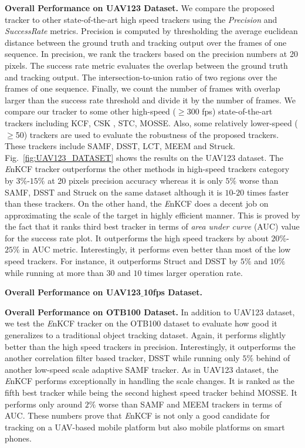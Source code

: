 \documentclass{bmvc2k}
\begin{document}
\textbf{Overall Performance on UAV123 Dataset.}
We compare the proposed tracker to other state-of-the-art high speed
trackers using the \textit{Precision} and \textit{Success\:Rate}
metrics. Precision is computed by thresholding the average euclidean
distance between the ground truth and tracking output over the frames
of one sequence. In precision, we rank the trackers based on the
precision numbers at 20 pixels. The success rate metric evaluates the
overlap between the ground truth and tracking output. The
intersection-to-union ratio of two regions over the frames of one
sequence. Finally, we count the number of frames with overlap larger
than the success rate threshold and divide it by the number of
frames. We compare our tracker to some other high-speed ($\geq$300
fps) state-of-the-art trackers including KCF\cite{henriques2015high},
CSK \cite{henriques2012exploiting}, STC\cite{zhang2014fast},
MOSSE\cite{bolme2010visual,henriques2015high}. Also, some relatively
lower-speed ($\geq$50) trackers are used to evaluate the robustness of
the proposed trackers. These trackers include SAMF\cite{li2014scale},
DSST\cite{danelljan2014accurate}, LCT\cite{ma2015long},
MEEM\cite{zhang2014meem} and Struck\cite{hare2012efficient}.
Fig.~\ref{fig:UAV123_DATASET} shows the results on the UAV123
dataset. The {\it E}nKCF tracker outperforms the other methods in
high-speed trackers category by $3\%$-$15\%$ at 20 pixels precision
accuracy whereas it is only $5\%$ worse than SAMF, DSST and Struck on
the same dataset although it is $10$-$20$ times faster than these
trackers. On the other hand, the {\it E}nKCF does a decent job on
approximating the scale of the target in highly efficient manner. This
is proved by the fact that it ranks third best tracker in terms of
\textit{area under curve} (AUC) value for the success rate plot. It
outperforms the high speed trackers by about $20\%$-$25\%$ in AUC
metric. Interestingly, it performs even better than most of the low
speed trackers. For instance, it outperforms Struct and DSST by $5\%$
and $10\%$ while running at more than $30$ and $10$ times larger
operation rate.

\textbf{Overall Performance on UAV123$\_$10fps Dataset.}

\textbf{Overall Performance on OTB100 Dataset.}
In addition to UAV123 dataset, we test the {\it E}nKCF tracker on the
OTB100 dataset to evaluate how good it generalizes to a traditional
object tracking dataset. Again, it performs slightly better than the
high speed trackers in precision. Interestingly, it outperforms the
another correlation filter based tracker, DSST while running only
$5\%$ behind of another low-speed scale adaptive SAMF tracker. As in
UAV123 dataset, the {\it E}nKCF performs exceptionally in handling the
scale changes. It is ranked as the fifth best tracker while being the
second highest speed tracker behind MOSSE. It performs only around
$2\%$ worse than SAMF and MEEM trackers in terms of AUC. These numbers
prove that {\it E}nKCF is not only a good candidate for tracking on a
UAV-based mobile platform but also mobile platforms on smart phones.
\end{document}
